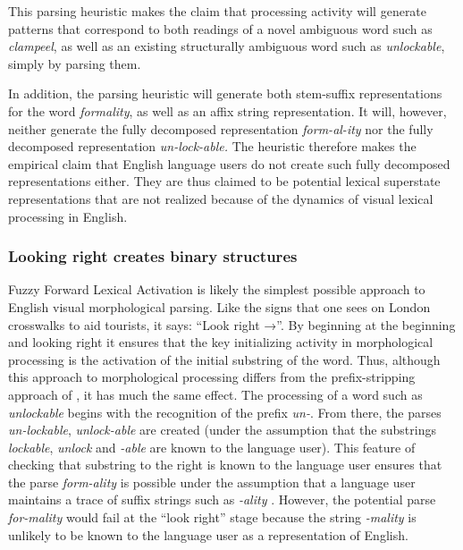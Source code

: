 \documentclass[output=paper]{langsci/langscibook}
\begin{document}
This parsing heuristic makes the claim that processing activity will generate patterns that correspond to both readings of a novel ambiguous word such as \textit{clampeel}, as well as an existing structurally ambiguous word such as \textit{unlockable}, simply by parsing them.

In addition, the parsing heuristic will generate both stem-suffix representations for the word \textit{formality}, as well as an affix string representation. It will, however, neither generate the fully decomposed representation \textit{form-al-ity} nor the fully decomposed representation \textit{un-lock-able.} The heuristic therefore makes the empirical claim that English language users do not create such fully decomposed representations either.  They are thus claimed to be potential lexical superstate representations that are not realized because of the dynamics of visual lexical processing in English. 

\subsubsection{Looking right creates binary structures}\label{sec:libben:1.4.1}

Fuzzy Forward Lexical Activation is likely the simplest possible approach to English visual morphological parsing. Like the signs that one sees on London crosswalks to aid tourists, it says: “Look right →”.  By beginning at the beginning and looking right it ensures that the key initializing activity in morphological processing is the activation of the initial substring of the word. Thus, although this approach to morphological processing differs from the prefix-stripping approach of \citet{TaftForster1975}, it has much the same effect.  The processing of a word such as \textit{unlockable} begins with the recognition of the prefix \textit{un-}. 
From there, the parses \textit{un-lockable}, \textit{unlock-able} are created (under the assumption that the substrings \textit{lockable}, \textit{unlock} and \textit{-able} are known to the language user). This feature of checking that substring to the right is known to the language user ensures that the parse \textit{form-ality} is possible under the assumption that a language user maintains a trace of suffix strings such as \textit{-ality} \citep{Derwing2014,LibbenJaremaEtAl2016}.  However, the potential parse \textit{for-mality} would fail at the “look right” stage because the string \textit{-mality} is unlikely to be known to the language user as a representation of English.
\end{document}
